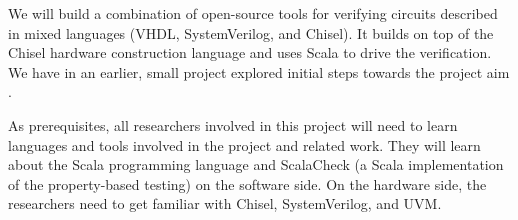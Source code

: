 \documentclass[fleqn,12pt]{article}
\begin{document}
We will build a combination of open-source tools for verifying
circuits described in mixed languages (VHDL, SystemVerilog, and Chisel).
It builds on top of the Chisel hardware construction language and uses Scala to drive the verification.
We have in an earlier, small project explored initial steps towards
the project aim \cite{verify:chisel:2020}.






As prerequisites, all researchers involved in this project will need to learn
languages and tools involved in the project and related work.
They will learn about the Scala programming language and ScalaCheck
(a Scala implementation of the property-based testing) on the software side.
On the hardware side,
the researchers need to get familiar with Chisel, SystemVerilog, and
UVM.
\end{document}

